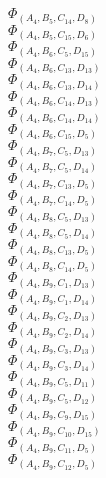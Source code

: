 \documentclass[14pt]{article}
\begin{document}
    $\Phi_{({A}_{4}, {B}_{5}, {C}_{14}, {D}_{8})}$ \\ 
    $\Phi_{({A}_{4}, {B}_{5}, {C}_{15}, {D}_{6})}$ \\ 
    $\Phi_{({A}_{4}, {B}_{6}, {C}_{5}, {D}_{15})}$ \\ 
    $\Phi_{({A}_{4}, {B}_{6}, {C}_{13}, {D}_{13})}$ \\ 
    $\Phi_{({A}_{4}, {B}_{6}, {C}_{13}, {D}_{14})}$ \\ 
    $\Phi_{({A}_{4}, {B}_{6}, {C}_{14}, {D}_{13})}$ \\ 
    $\Phi_{({A}_{4}, {B}_{6}, {C}_{14}, {D}_{14})}$ \\ 
    $\Phi_{({A}_{4}, {B}_{6}, {C}_{15}, {D}_{5})}$ \\ 
    $\Phi_{({A}_{4}, {B}_{7}, {C}_{5}, {D}_{13})}$ \\ 
    $\Phi_{({A}_{4}, {B}_{7}, {C}_{5}, {D}_{14})}$ \\ 
    $\Phi_{({A}_{4}, {B}_{7}, {C}_{13}, {D}_{5})}$ \\ 
    $\Phi_{({A}_{4}, {B}_{7}, {C}_{14}, {D}_{5})}$ \\ 
    $\Phi_{({A}_{4}, {B}_{8}, {C}_{5}, {D}_{13})}$ \\ 
    $\Phi_{({A}_{4}, {B}_{8}, {C}_{5}, {D}_{14})}$ \\ 
    $\Phi_{({A}_{4}, {B}_{8}, {C}_{13}, {D}_{5})}$ \\ 
    $\Phi_{({A}_{4}, {B}_{8}, {C}_{14}, {D}_{5})}$ \\ 
    $\Phi_{({A}_{4}, {B}_{9}, {C}_{1}, {D}_{13})}$ \\ 
    $\Phi_{({A}_{4}, {B}_{9}, {C}_{1}, {D}_{14})}$ \\ 
    $\Phi_{({A}_{4}, {B}_{9}, {C}_{2}, {D}_{13})}$ \\ 
    $\Phi_{({A}_{4}, {B}_{9}, {C}_{2}, {D}_{14})}$ \\ 
    $\Phi_{({A}_{4}, {B}_{9}, {C}_{3}, {D}_{13})}$ \\ 
    $\Phi_{({A}_{4}, {B}_{9}, {C}_{3}, {D}_{14})}$ \\ 
    $\Phi_{({A}_{4}, {B}_{9}, {C}_{5}, {D}_{11})}$ \\ 
    $\Phi_{({A}_{4}, {B}_{9}, {C}_{5}, {D}_{12})}$ \\ 
    $\Phi_{({A}_{4}, {B}_{9}, {C}_{9}, {D}_{15})}$ \\ 
    $\Phi_{({A}_{4}, {B}_{9}, {C}_{10}, {D}_{15})}$ \\ 
    $\Phi_{({A}_{4}, {B}_{9}, {C}_{11}, {D}_{5})}$ \\ 
    $\Phi_{({A}_{4}, {B}_{9}, {C}_{12}, {D}_{5})}$ \\ 
\end{document}

